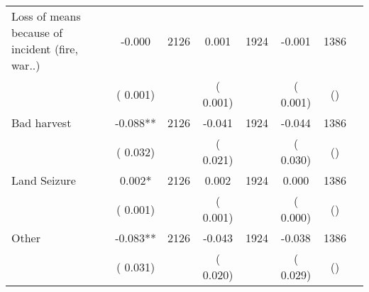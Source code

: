 \begin{tabular}{l*{6}{c}}
Loss of means because of incident (fire, war..)        &             -0.000      &       2126       &              0.001      &       1924       &             -0.001      &       1386  &  &              \\
                       &       (       0.001)            &                               &       (       0.001)            &                               &       (       0.001)            &       () &                  \\
Bad harvest        &             -0.088**      &       2126       &             -0.041      &       1924       &             -0.044      &       1386  &  &              \\
                       &       (       0.032)            &                               &       (       0.021)            &                               &       (       0.030)            &       () &                  \\
Land Seizure        &              0.002*      &       2126       &              0.002      &       1924       &              0.000      &       1386  &  &              \\
                       &       (       0.001)            &                               &       (       0.001)            &                               &       (       0.000)            &       () &                  \\
Other        &             -0.083**      &       2126       &             -0.043      &       1924       &             -0.038      &       1386  &  &              \\
                       &       (       0.031)            &                               &       (       0.020)            &                               &       (       0.029)            &       () &                  \\
\hline \end{tabular}